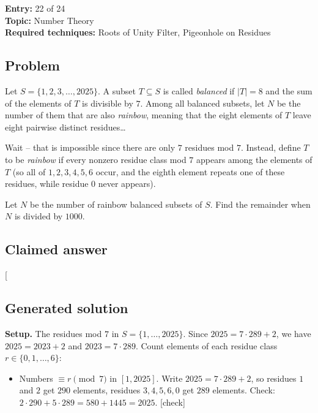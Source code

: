 \documentclass[
  11pt,
  letterpaper,
]{article}
\providecommand{\tightlist}{%
  \setlength{\itemsep}{0pt}\setlength{\parskip}{0pt}}
\begin{document}
\textbf{Entry:} 22 of 24\\
\textbf{Topic:} Number Theory\\
\textbf{Required techniques:} Roots of Unity Filter, Pigeonhole on
Residues

\subsection{Problem}\label{problem-21}

Let \(S = \{1, 2, 3, \dots, 2025\}\). A subset \(T \subseteq S\) is
called \emph{balanced} if \(|T| = 8\) and the sum of the elements of
\(T\) is divisible by \(7\). Among all balanced subsets, let \(N\) be
the number of them that are also \emph{rainbow}, meaning that the eight
elements of \(T\) leave eight pairwise distinct residues\ldots{}

Wait -- that is impossible since there are only \(7\) residues mod
\(7\). Instead, define \(T\) to be \emph{rainbow} if every nonzero
residue class mod \(7\) appears among the elements of \(T\) (so all of
\(1,2,3,4,5,6\) occur, and the eighth element repeats one of these
residues, while residue \(0\) never appears).

Let \(N\) be the number of rainbow balanced subsets of \(S\). Find the
remainder when \(N\) is divided by \(1000\).

\subsection{Claimed answer}\label{claimed-answer-21}

{[}\boxed{250}{]}

\subsection{Generated solution}\label{generated-solution-21}

\textbf{Setup.} The residues mod \(7\) in \(S=\{1,\dots,2025\}\). Since
\(2025 = 7\cdot 289 + 2\), we have \(2025 = 2023 + 2\) and
\(2023 = 7\cdot 289\). Count elements of each residue class
\(r \in \{0,1,\dots,6\}\):

\begin{itemize}
\tightlist
\item
  Numbers \(\equiv r \pmod 7\) in \([1,2025]\). Write
  \(2025 = 7\cdot 289 + 2\), so residues \(1\) and \(2\) get \(290\)
  elements, residues \(3,4,5,6,0\) get \(289\) elements. Check:
  \(2\cdot 290 + 5\cdot 289 = 580 + 1445 = 2025\). {[}check{]}
\end{itemize}
\end{document}
